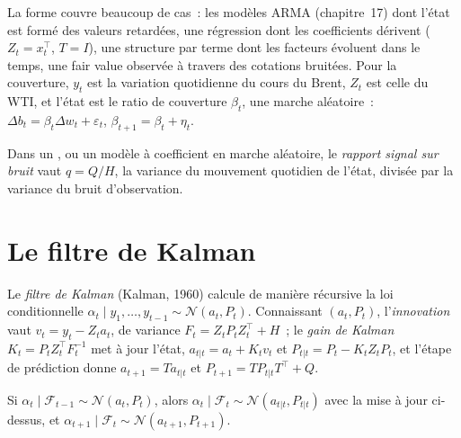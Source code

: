 La forme couvre beaucoup de cas~: les modèles ARMA (chapitre~17) dont l'état est formé des valeurs retardées, une régression dont les coefficients dérivent ($Z_t = x_t^\top$,
$T = I$), une structure par terme dont les facteurs évoluent dans le temps, une fair value observée à travers des cotations bruitées. Pour la couverture, $y_t$ est la variation quotidienne du cours du Brent,
$Z_t$ est celle du WTI, et l'état est le ratio de couverture $\beta_t$, une marche aléatoire~: $\Delta b_t = \beta_t\Delta w_t + \varepsilon_t$, $\beta_{t+1} = \beta_t + \eta_t$.

\begin{definition}\label{def:qm:state-space-models-and-the-kalman-filter:snr}
Dans un , ou un modèle à coefficient en marche aléatoire, le \emph{rapport signal sur bruit} vaut $q = Q/H$, la variance du
mouvement quotidien de l'état, divisée par la variance du bruit d'observation.
\end{definition}

\section{Le filtre de Kalman}

\begin{definition}\label{def:qm:state-space-models-and-the-kalman-filter:kf}
Le \emph{filtre de Kalman} (Kalman, 1960) calcule de manière récursive la loi conditionnelle $\alpha_t \mid y_1, \dots, y_{t-1} \sim \mathcal N(a_t, P_t)$.
Connaissant $(a_t, P_t)$, l'\emph{innovation} vaut $v_t = y_t - Z_ta_t$, de variance $F_t = Z_tP_tZ_t^\top + H$~; le \emph{gain de Kalman}
$K_t = P_tZ_t^\top F_t^{-1}$ met à jour l'état, $a_{t|t} = a_t + K_tv_t$ et $P_{t|t} = P_t - K_tZ_tP_t$, et l'étape de prédiction donne $a_{t+1} = Ta_{t|t}$ et
$P_{t+1} = TP_{t|t}T^\top + Q$.
\end{definition}

\begin{proposition}\label{prop:qm:state-space-models-and-the-kalman-filter:kf}
Si $\alpha_t \mid \mathcal F_{t-1} \sim \mathcal N(a_t, P_t)$, alors $\alpha_t \mid \mathcal F_t \sim \mathcal N(a_{t|t}, P_{t|t})$ avec la mise à jour ci-dessus, et
$\alpha_{t+1} \mid \mathcal F_t \sim \mathcal N(a_{t+1}, P_{t+1})$.
\end{proposition}

